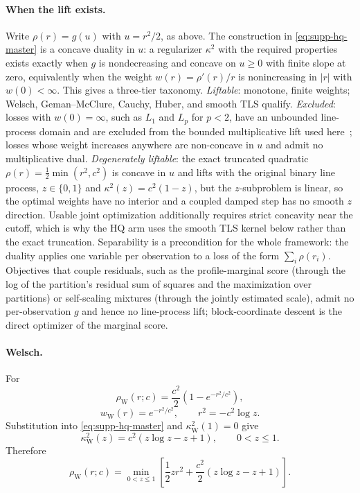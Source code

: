 \documentclass[runningheads]{llncs}
\begin{document}
\paragraph{When the lift exists.}
Write $\rho(r)=g(u)$ with $u=r^2/2$, as above. The construction in
\cref{eq:supp-hq-master} is a concave duality in $u$: a regularizer
$\kappa^2$ with the required properties exists exactly when $g$ is
nondecreasing and concave on $u\ge0$ with finite slope at zero,
equivalently when the weight $w(r)=\rho'(r)/r$ is nonincreasing in
$|r|$ with $w(0)<\infty$. This gives a three-tier taxonomy.
\emph{Liftable}: monotone, finite weights; Welsch, Geman--McClure,
Cauchy, Huber, and smooth TLS qualify. \emph{Excluded}: losses with
$w(0)=\infty$, such as $L_1$ and $L_p$ for $p<2$, have an unbounded
line-process domain and are excluded from the bounded multiplicative lift
used here~\cite{BlackRangarajan1996}; losses whose weight increases
anywhere are non-concave in $u$ and admit no multiplicative dual.
\emph{Degenerately liftable}: the exact truncated quadratic
$\rho(r)=\tfrac12\min(r^2,c^2)$ is concave in $u$ and lifts with the
original binary line process, $z\in\{0,1\}$ and
$\kappa^2(z)=c^2(1-z)$, but the $z$-subproblem is linear, so the
optimal weights have no interior and a coupled damped step has no
smooth $z$ direction. Usable joint optimization additionally requires
strict concavity near the cutoff, which is why the HQ arm uses the
smooth TLS kernel below rather than the exact truncation.
Separability is a precondition for the whole framework: the duality
applies one variable per observation to a loss of the form
$\sum_i\rho(r_i)$. Objectives that couple residuals, such as the
profile-marginal score (through the log of the partition's residual
sum of squares and the maximization over partitions) or self-scaling
mixtures (through the jointly estimated scale), admit no
per-observation $g$ and hence no line-process lift; block-coordinate
descent is the direct optimizer of the marginal score.

\paragraph{Welsch.}
For
\begin{equation}
	\rho_{\mathrm W}(r;c)
	=\frac{c^2}{2}\left(1-e^{-r^2/c^2}\right),
\end{equation}
\begin{equation}
	w_{\mathrm W}(r)=e^{-r^2/c^2},
	\qquad
	r^2=-c^2\log z.
\end{equation}
Substitution into \cref{eq:supp-hq-master} and
$\kappa_{\mathrm W}^2(1)=0$ give
\begin{equation}
	\boxed{
		\kappa_{\mathrm W}^2(z)
		=c^2\left(z\log z-z+1\right),
		\qquad 0<z\le1.
	}
	\label{eq:supp-welsch-kappa}
\end{equation}
Therefore
\begin{equation}
	\rho_{\mathrm W}(r;c)
	=
	\min_{0<z\le1}
	\left[
		\frac12zr^2
		+\frac{c^2}{2}\left(z\log z-z+1\right)
		\right].
	\label{eq:supp-welsch-lift}
\end{equation}
\end{document}
